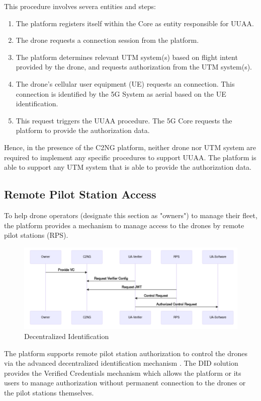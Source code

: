 \documentclass[a4paper,conference]{IEEEtran}
\begin{document}
This procedure involves severa entities and steps:

\begin{enumerate}
  \item The platform registers itself within the Core as entity responsible for UUAA.
  \item The drone requests a connection session from the platform.
  \item The platform determines relevant UTM system(s) based on flight intent provided by the drone, and requests authorization from the UTM system(s).
  \item The drone's cellular user equipment (UE) requests an connection. This connection is identified by the 5G System as aerial based on the UE identification.
  \item This request triggers the UUAA procedure. The 5G Core requests the platform to provide the authorization data.
\end{enumerate}

Hence, in the presence of the C2NG platform, neither drone nor UTM system are required to implement any specific procedures to support UUAA. The platform is able to support any UTM system that is able to provide the authorization data.

\subsection{Remote Pilot Station Access}
\label{section:did}

To help drone operators (designate this section as "owners") to manage their fleet, the platform provides a mechanism to manage access to the drones by remote pilot stations (RPS).

\begin{figure}[!ht]
\centering
\includegraphics[width=0.9\linewidth]{images/did.png}
\caption{Decentralized Identification}\label{fig:did}
\end{figure}

The platform supports remote pilot station authorization to control the drones via the advanced decentralized identification mechanism \cite{excid:did}. The DID solution provides the Verified Credentials mechanism which allows the platform or its users to manage authorization without permanent connection to the drones or the pilot stations themselves.
\end{document}
